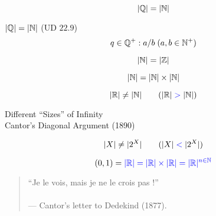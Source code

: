 \begin{frame}{}
  \begin{theorem}[$\aleph_0$ (1874)]
    \[
      |\mathbb{Q}| = |\mathbb{N}|
    \]
  \end{theorem}

  \pause
  \begin{exampleblock}{$|\mathbb{Q}| = |\mathbb{N}|$ (UD $22.9$)}
    \[
      q \in \mathbb{Q}^{+}: a / b \; (a,b \in \mathbb{N}^{+})
    \]
  \end{exampleblock}
\end{frame}

\begin{frame}{}
  \[
    |\mathbb{N}| = |\mathbb{Z}|
  \]

  \[
    |\mathbb{N}| = |\mathbb{N}| \times |\mathbb{N}|
  \]
\end{frame}

\begin{frame}{}
  \begin{theorem}
    \[
      |\mathbb{R}| \neq |\mathbb{N}| \qquad (|\mathbb{R}| \;\textcolor{blue}{>}\; |\mathbb{N}|)
    \]
  \end{theorem}

  \pause
  \vspace{0.60cm}
  \begin{center}
    Different ``Sizes'' of Infinity \\[10pt]
    Cantor's Diagonal Argument (1890)
  \end{center}

  \pause
  \vspace{0.50cm}
  \begin{theorem}
    \[
      |X| \neq |2^{X}| \qquad (|X| \;\textcolor{blue}{<}\; |2^{X}|)
    \]
  \end{theorem}
\end{frame}

\begin{frame}{}
  \begin{theorem}[$|\R|$ (1877)]
    \[
      (0,1) = \textcolor{blue}{|\mathbb{R}| = |\mathbb{R}| \times |\mathbb{R}| = |\mathbb{R}|^{n \in \mathbb{N}}}
    \]
  \end{theorem}

  \pause
  \vspace{0.80cm}
  \begin{quote}
    \begin{center}
      ``Je le vois, mais je ne le crois pas !'' \\[8pt]
       \\[10pt]
      \hfill --- Cantor's letter to Dedekind (1877). 
    \end{center}
  \end{quote}

  \vspace{0.60cm}
\end{frame}
